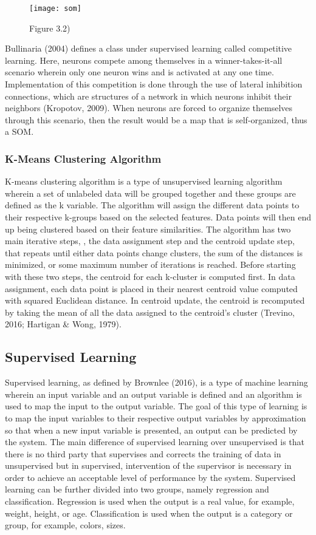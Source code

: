 \begin{figure}[h]
\caption{Figure 3.2)}
\centering
\texttt{[image: som]}
\end{figure}

Bullinaria (2004) defines a class under supervised learning called competitive learning. Here, neurons compete among themselves in a winner-takes-it-all scenario wherein only one neuron wins and is activated at any one time. Implementation of this competition is done through the use of lateral inhibition connections, which are structures of a network in which neurons inhibit their neighbors (Kropotov, 2009). When neurons are forced to organize themselves through this scenario, then the result would be a map that is self-organized, thus a SOM.

\subsubsection{K-Means Clustering Algorithm}

K-means clustering algorithm is a type of unsupervised learning algorithm wherein a set of unlabeled data will be grouped together and these groups are defined as the k variable. The algorithm will assign the different data points to their respective k-groups based on the selected features. Data points will then end up being clustered based on their feature similarities. The algorithm has two main iterative steps, , the data assignment step and the centroid update step, that repeats until either data points change clusters, the sum of the distances is minimized, or some maximum number of iterations is reached. Before starting with these two steps, the centroid for each k-cluster is computed first. In data assignment, each data point is placed in their nearest centroid value computed with squared Euclidean distance. In centroid update, the centroid is recomputed by taking the mean of all the data assigned to the centroid’s cluster (Trevino, 2016; Hartigan \& Wong, 1979). 

\subsection{Supervised Learning}

Supervised learning, as defined by Brownlee (2016), is a type of machine learning wherein an input variable and an output variable is defined and an algorithm is used to map the input to the output variable. The goal of this type of learning is to map the input variables to their respective output variables by approximation so that when a new input variable is presented, an output can be predicted by the system. The main difference of supervised learning over unsupervised is that there is no third party that supervises and corrects the training of data in unsupervised but in supervised, intervention of the supervisor is necessary in order to achieve an acceptable level of performance by the system. Supervised learning can be further divided into two groups, namely regression and classification. Regression is used when the output is a real value, for example, weight, height, or age. Classification is used when the output is a category or group, for example, colors, sizes.

